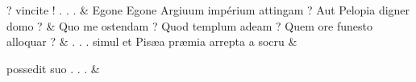 \documentclass[12pt,onecolumn,twoside,a4paper]{memoir}
\begin{document}
\begin{pairs}
\begin{Leftside}
                              ?
                              vincite
                              !
                              .
                              .
                              . \&
                         \stanza {}Egone
                              {Egone}
                              Argiuum
                              impérium
                              attingam
                              ?
                              Aut
                              Pelopia
                              digner
                              domo
                              ? & 
                     Quo
                              me
                              ostendam
                              ?
                              Quod
                              templum
                              adeam
                              ?
                              Quem
                              ore
                              funesto
                              alloquar
                              ? \&
                         \stanza {}.
                              .
                              .
                              simul
                              et
                              Pisæa
                              præmia
                              arrepta
                              a
                              socru & 
                     
                              possedit
                              suo
                              .
                              .
                              . \&
                     
                  \endnumbering
		\end{Leftside}
                  \begin{Rightside}
			\beginnumbering
			\numberstanzafalse
                     

\end{Rightside}
\end{pairs}
\end{document}
